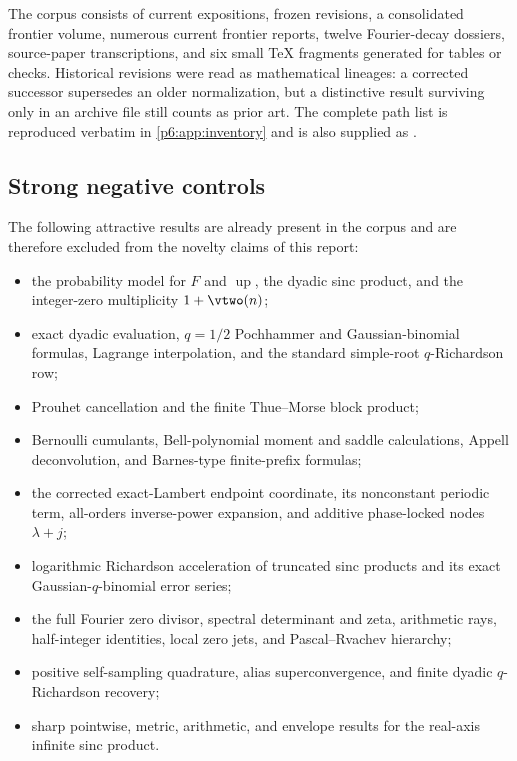 \documentclass[11pt]{article}
\numberwithin{equation}{section}
\theoremstyle{definition}
\theoremstyle{remark}
\newcommand{\Up}{\operatorname{up}}
\begin{document}
The corpus consists of current expositions, frozen revisions, a consolidated frontier
volume, numerous current frontier reports, twelve Fourier-decay dossiers, source-paper
transcriptions, and six small TeX fragments generated for tables or checks.  Historical
revisions were read as mathematical lineages: a corrected successor supersedes an older
normalization, but a distinctive result surviving only in an archive file still counts as
prior art.  The complete path list is reproduced verbatim in \cref{p6:app:inventory} and is
also supplied as
 \cite{p6:proveit}.

\subsection{Strong negative controls}

The following attractive results are already present in the corpus and are therefore
excluded from the novelty claims of this report:
\begin{itemize}
\item the probability model for $F$ and $\Up$, the dyadic sinc product, and the integer-zero
      multiplicity $1+\vtwo(n)$;
\item exact dyadic evaluation, $q=1/2$ Pochhammer and Gaussian-binomial formulas, Lagrange
      interpolation, and the standard simple-root $q$-Richardson row;
\item Prouhet cancellation and the finite Thue--Morse block product;
\item Bernoulli cumulants, Bell-polynomial moment and saddle calculations, Appell
      deconvolution, and Barnes-type finite-prefix formulas;
\item the corrected exact-Lambert endpoint coordinate, its nonconstant periodic term,
      all-orders inverse-power expansion, and additive phase-locked nodes $\lambda+j$;
\item logarithmic Richardson acceleration of truncated sinc products and its exact
      Gaussian-$q$-binomial error series;
\item the full Fourier zero divisor, spectral determinant and zeta, arithmetic rays,
      half-integer identities, local zero jets, and Pascal--Rvachev hierarchy;
\item positive self-sampling quadrature, alias superconvergence, and finite dyadic
      $q$-Richardson recovery;
\item sharp pointwise, metric, arithmetic, and envelope results for the real-axis infinite
      sinc product.
\end{itemize}
\end{document}
